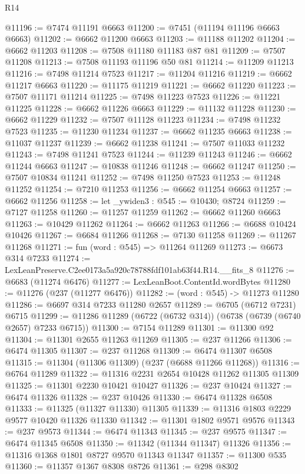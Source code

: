 \begin{lexlean}{R14}
\begin{coremodule}
@11196 := @7474 @11191 @6663
@11200 := @7451 (@11194 @11196 @6663 @6663)
@11202 := @6662 @11200 @6663
@11203 := @11188 @11202
@11204 := @6662 @11203
@11208 := @7508 @11180 @11183 @87 @81
@11209 := @7507 @11208
@11213 := @7508 @11193 @11196 @50 @81
@11214 := @11209 @11213
@11216 := @7498 @11214 @7523
@11217 := @11204 @11216
@11219 := @6662 @11217 @6663
@11220 := @11175 @11219
@11221 := @6662 @11220
@11223 := @7507 @11171 @11214
@11225 := @7498 @11223 @7523
@11226 := @11221 @11225
@11228 := @6662 @11226 @6663
@11229 := @11132 @11228
@11230 := @6662 @11229
@11232 := @7507 @11128 @11223
@11234 := @7498 @11232 @7523
@11235 := @11230 @11234
@11237 := @6662 @11235 @6663
@11238 := @11037 @11237
@11239 := @6662 @11238
@11241 := @7507 @11033 @11232
@11243 := @7498 @11241 @7523
@11244 := @11239 @11243
@11246 := @6662 @11244 @6663
@11247 := @10838 @11246
@11248 := @6662 @11247
@11250 := @7507 @10834 @11241
@11252 := @7498 @11250 @7523
@11253 := @11248 @11252
@11254 := @7210 @11253
@11256 := @6662 @11254 @6663
@11257 := @6662 @11256
@11258 := let _ywiden3 : @545 := @10430; @8724
@11259 := @7127 @11258
@11260 := @11257 @11259
@11262 := @6662 @11260 @6663
@11263 := @10429 @11262
@11264 := @6662 @11263
@11266 := @6688 @10424 @10426
@11267 := @6684 @11266
@11268 := @7130 @11258
@11269 := @11267 @11268
@11271 := fun (word : @545) => @11264 @11269
@11273 := @6673 @314 @7233
@11274 := LexLeanPreserve.C2ee0173a5a920c78788fdf101ab63f44.R14.__fits_8
@11276 := @6683 (@11274 @6476)
@11277 := LexLeanBoot.ContentId.wordBytes
@11280 := @11276 (@237 (@11277 @6476))
@11282 := (word : @545) -> @11273 @11280
@11286 := @6697 @314 @7233 @11280 @2657
@11289 := @6705 (@6712 @7231) @6715
@11299 := @11286 @11289 (@6722 (@6732 @314)) (@6738 (@6739 (@6740 @2657) @7233 @6715))
@11300 := @7154 @11289
@11301 := @11300 @92
@11304 := @11301 @2655 @11263 @11269
@11305 := @237 @11266
@11306 := @6474 @11305
@11307 := @237 @11268
@11309 := @6474 @11307 @6508
@11315 := @11304 (@11306 @11309) (@237 (@6688 @11266 @11268))
@11316 := @6764 @11289
@11322 := @11316 @2231 @2654 @10428 @11262 @11305 @11309
@11325 := @11301 @2230 @10421 @10427
@11326 := @237 @10424
@11327 := @6474 @11326
@11328 := @237 @10426
@11330 := @6474 @11328 @6508
@11333 := @11325 (@11327 @11330) @11305
@11339 := @11316 @1803 @2229 @9577 @10420 @11326 @11330
@11342 := @11301 @1802 @9571 @9576
@11343 := @237 @9573
@11344 := @6474 @11343
@11345 := @237 @9575
@11347 := @6474 @11345 @6508
@11350 := @11342 (@11344 @11347) @11326
@11356 := @11316 @1368 @1801 @8727 @9570 @11343 @11347
@11357 := @11300 @535
@11360 := @11357 @1367 @8308 @8726
@11361 := @298 @8302

\end{coremodule}
\end{lexlean}
